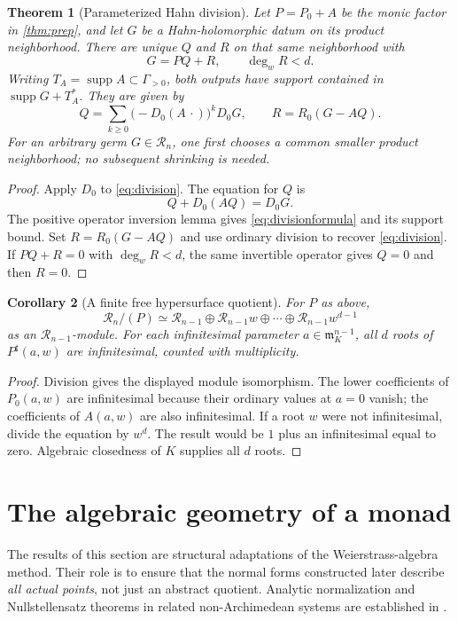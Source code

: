 \documentclass[11pt]{article}
\newtheorem{theorem}{Theorem}[section]
\newtheorem{corollary}[theorem]{Corollary}
\theoremstyle{definition}
\newcommand{\RR}{\mathscr R}
\newcommand{\mm}{\mathfrak m}
\newcommand{\supp}{\operatorname{supp}}
\newcommand{\sh}{^{\sharp}}
\begin{document}
\begin{theorem}[Parameterized Hahn division]\label{thm:division}
Let $P=P_0+A$ be the monic factor in \cref{thm:prep}, and let $G$ be a Hahn-holomorphic datum on its product neighborhood. There are unique $Q$ and $R$ on that same neighborhood with
\begin{equation}\label{eq:division}
 G=PQ+R,\qquad \deg_wR<d.
\end{equation}
Writing $T_A=\supp A\subset\Gamma_{>0}$, both outputs have support contained in $\supp G+T_A^*$. They are given by
\begin{equation}\label{eq:divisionformula}
 Q=\sum_{k\ge0}\bigl(-D_0(A\,\cdot)\bigr)^kD_0G,
 \qquad R=R_0(G-AQ).
\end{equation}
For an arbitrary germ $G\in\RR_n$, one first chooses a common smaller product neighborhood; no subsequent shrinking is needed.
\end{theorem}
\begin{proof}
Apply $D_0$ to \eqref{eq:division}. The equation for $Q$ is
\[
 Q+D_0(AQ)=D_0G.
\]
The positive operator inversion lemma gives \eqref{eq:divisionformula} and its support bound. Set $R=R_0(G-AQ)$ and use ordinary division to recover \eqref{eq:division}. If $PQ+R=0$ with $\deg_wR<d$, the same invertible operator gives $Q=0$ and then $R=0$.
\end{proof}

\begin{corollary}[A finite free hypersurface quotient]\label{cor:freehypersurface}
For $P$ as above,
\[
 \RR_n/(P)\simeq
 \RR_{n-1}\oplus\RR_{n-1}w\oplus\cdots\oplus\RR_{n-1}w^{d-1}
\]
as an $\RR_{n-1}$-module. For each infinitesimal parameter $a\in\mm_K^{n-1}$, all $d$ roots of $P\sh(a,w)$ are infinitesimal, counted with multiplicity.
\end{corollary}
\begin{proof}
Division gives the displayed module isomorphism. The lower coefficients of $P_0(a,w)$ are infinitesimal because their ordinary values at $a=0$ vanish; the coefficients of $A(a,w)$ are also infinitesimal. If a root $w$ were not infinitesimal, divide the equation by $w^d$. The result would be $1$ plus an infinitesimal equal to zero. Algebraic closedness of $K$ supplies all $d$ roots.
\end{proof}

\section{The algebraic geometry of a monad}\label{sec:ring}
The results of this section are structural adaptations of the Weierstrass-algebra method. Their role is to ensure that the normal forms constructed later describe \emph{all actual points}, not just an abstract quotient. Analytic normalization and Nullstellensatz theorems in related non-Archimedean systems are established in \cite[\S5.2]{CL}.
\end{document}
